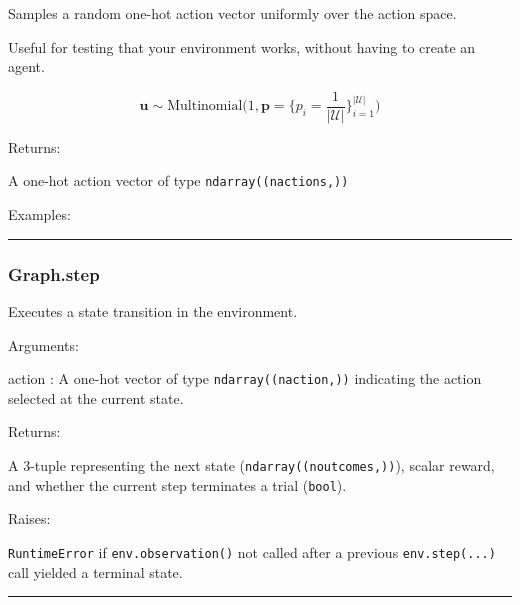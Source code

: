 Samples a random one-hot action vector uniformly over the action space.

Useful for testing that your environment works, without having to create
an agent.

\[
\mathbf u \sim \mathrm{Multinomial}\Big(1, \mathbf p=\{p_i = \frac{1}{|\mathcal U|}\}_{i=1}^{|\mathcal U|}\Big)
\]

Returns:

A one-hot action vector of type \texttt{ndarray((nactions,))}

Examples:

\begin{Shaded}
\begin{Highlighting}[]
\OperatorTok{=}
\end{Highlighting}
\end{Shaded}

\begin{center}\rule{0.5\linewidth}{\linethickness}\end{center}

\hypertarget{graph.step}{%
\subsubsection{Graph.step}\label{graph.step}}

\begin{Shaded}
\begin{Highlighting}[]
\end{Highlighting}
\end{Shaded}

Executes a state transition in the environment.

Arguments:

action : A one-hot vector of type \texttt{ndarray((naction,))}
indicating the action selected at the current state.

Returns:

A 3-tuple representing the next state (\texttt{ndarray((noutcomes,))}),
scalar reward, and whether the current step terminates a trial
(\texttt{bool}).

Raises:

\texttt{RuntimeError} if \texttt{env.observation()} not called after a
previous \texttt{env.step(...)} call yielded a terminal state.

\begin{center}\rule{0.5\linewidth}{\linethickness}\end{center}

